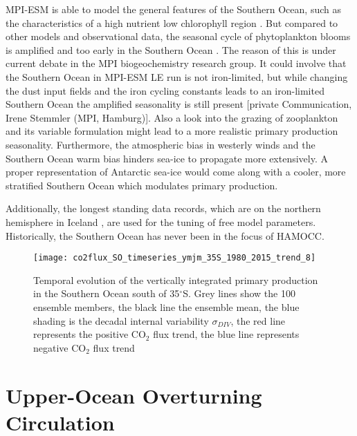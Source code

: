 \acs{MPI-ESM} is able to model the general features of the Southern Ocean, such as the characteristics of a high nutrient low chlorophyll region \citep{Bopp2013}. But compared to other models and observational data, the seasonal cycle of phytoplankton blooms is amplified and too early in the Southern Ocean \citep{Bopp2013,Nevison2015,Nevison2016}. The reason of this is under current debate in the MPI biogeochemistry research group. It could involve that the Southern Ocean in \acs{MPI-ESM LE} run is not iron-limited, but while changing the dust input fields and the iron cycling constants leads to an iron-limited Southern Ocean the amplified seasonality is still present [private Communication, Irene Stemmler (MPI, Hamburg)]. Also a look into the grazing of zooplankton and its variable formulation might lead to a more realistic primary production seasonality. Furthermore, the atmospheric bias in westerly winds and the Southern Ocean warm bias \citep{Jungclaus2013} hinders sea-ice to propagate more extensively. A proper representation of Antarctic sea-ice would come along with a cooler, more stratified Southern Ocean which modulates primary production.

Additionally, the longest standing data records, which are on the northern hemisphere in Iceland \citep{Six1996}, are used for the tuning of free model parameters. Historically, the Southern Ocean has never been in the focus of \acs{HAMOCC}. 






\begin{figure}[h!]
	\centering
	\texttt{[image: co2flux\_SO\_timeseries\_ymjm\_35S\_1980\_2015\_trend\_8]}
	\caption{Temporal evolution of the vertically integrated primary production in the Southern Ocean south of 35$^\circ$S. Grey lines show the 100 ensemble members, the black line the ensemble mean, the blue shading is the decadal internal variability $\sigma_{DIV}$, the red line represents the positive CO$_2$ flux trend, the blue line represents negative CO$_2$ flux trend}
	\label{fig:evolution_southern_ocean_intpp}
\end{figure}




\clearpage

\section{Upper-Ocean Overturning Circulation}
\label{sec:UOOC}

